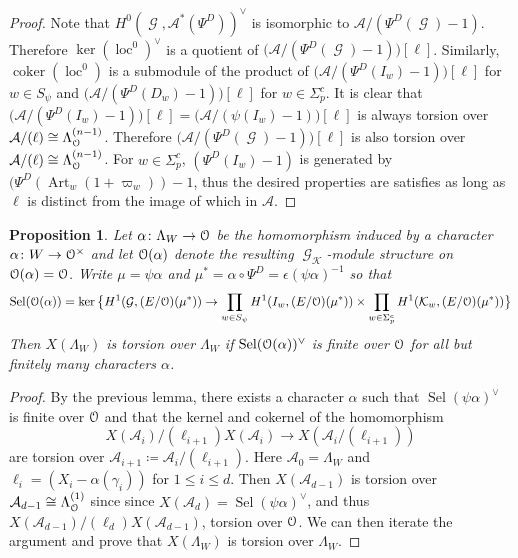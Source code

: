\documentclass[leqno]{amsart}
\newtheorem{prop}[thm]{Proposition}
\theoremstyle{definition}
\theoremstyle{remark}
\newcommand{\eo}{\EuScript{O}}
\DeclareMathOperator{\coker}{coker}
\DeclareMathOperator{\Gal}{\mathcal{G}}
\DeclareMathOperator{\Art}{Art}
\newcommand{\K}{{\mathcal{K}}} %
\DeclareMathOperator{\loc}{loc}
\DeclareMathOperator{\Sel}{Sel}
\newcommand{\Lda}[1]{\Lambda^{(#1)}}
\begin{document}
\begin{proof}
Note that $H^0(\Gal,\mathcal{A}^*(\Psi^D))^\vee$
is isomorphic to $\mathcal{A}/(\Psi^D(\Gal)-1)$.
Therefore $\ker(\loc^0)^\vee$ is a quotient of
$\big(\mathcal{A}/(\Psi^D(\Gal)-1)\big)[\ell]$.
Similarly, $\coker(\loc^0)$ is a submodule of 
the product of 
$\big(\mathcal{A}/(\Psi^D(I_w)-1)\big)[\ell]$
for $w\in S_\psi$ and
$\big(\mathcal{A}/(\Psi^D(D_w)-1)\big)[\ell]$
for $w\in \Sigma_p^c$.
It is clear that 
$\big(\mathcal{A}/(\Psi^D(I_w)-1)\big)[\ell]=
\big(\mathcal{A}/(\psi(I_w)-1)\big)[\ell]$
is always torsion over $\mathcal{A}/(\ell)\cong \Lda{n-1}_{\eo}$.
Therefore $\big(\mathcal{A}/(\Psi^D(\Gal)-1)\big)[\ell]$
is also torsion over $\mathcal{A}/(\ell)\cong \Lda{n-1}_{\eo}$.
For $w\in\Sigma_p^c$,
$(\Psi^D(I_w)-1)$ is generated by
$(\Psi^D(\Art_w(1+\varpi_w))-1$,
thus the desired properties are satisfies as long as 
$\ell$ is distinct from the image of which in $\mathcal{A}$.
    
\end{proof}

\begin{prop}\label{prop:tor_crit}
Let $\alpha\colon \Lambda_W\to \eo$
be the homomorphism induced by a
character $\alpha\colon W\to \eo^\times$
and let $\eo(\alpha)$ denote 
the resulting $\Gal_\K$-module structure
on $\eo(\alpha)=\eo$. 
Write $\mu=\psi\alpha$ and 
$\mu^*=\alpha\circ\Psi^D=\epsilon(\psi\alpha)^{-1}$ so that
\begin{equation}\label{eq:Sel_base}
\Sel(\eo(\alpha))=
\ker\big\{
H^1(\Gal, (E/\eo)(\mu^*))\to
\prod_{w\in S_\psi}
H^1(I_w,(E/\eo)(\mu^*))\times 
\prod_{w\in \Sigma_p^c}
H^1(\K_w,(E/\eo)(\mu^*))
\big\}
\end{equation}
Then $X(\Lambda_W)$
is torsion over $\Lambda_W$
if $\Sel(\eo(\alpha))^\vee$ is finite over $\eo$
for all but finitely many characters $\alpha$.
\end{prop}

\begin{proof}
By the previous lemma, there exists a character $\alpha$
such that  $\Sel(\psi\alpha)^\vee$ is finite over $\eo$
and that the kernel and cokernel of the homomorphism
\[
    X(\mathcal{A}_i)/(\ell_{i+1})X(\mathcal{A}_{i})
    \to X(\mathcal{A}_i/(\ell_{i+1}))
\]
are torsion over $\mathcal{A}_{i+1}\coloneqq \mathcal{A}_i/(\ell_{i+1})$.
Here $\mathcal{A}_0=\Lambda_W$
and $\ell_i=(X_i-\alpha(\gamma_i))$ for $1\leq i\leq d$.
Then $X(\mathcal{A}_{d-1})$ is torsion over 
$\mathcal{A}_{d-1}\cong \Lda{1}_{\eo}$ since
since $X(\mathcal{A}_d)=\Sel(\psi\alpha)^\vee$,
and thus $X(\mathcal{A}_{d-1})/(\ell_{d})X(\mathcal{A}_{d-1})$,
torsion over $\eo$.
We can then iterate the argument and prove that 
$X(\Lambda_W)$ is torsion over $\Lambda_W$.

\end{proof}
\end{document}
